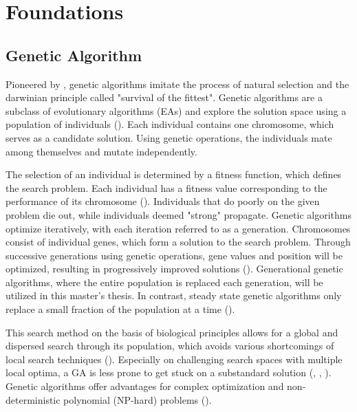 \chapter{Foundations}
\label{chap:foundations}

\section{Genetic Algorithm}
\label{sect:foundations:genetic_algorithm}
Pioneered by \cite{holland_adaptation_1992}, genetic algorithms imitate the process of natural selection and the darwinian principle called "survival of the fittest". Genetic algorithms are a subclass of evolutionary algorithms (EAs) and explore the solution space using a population of individuals (\cite{mills_determining_2015}). Each individual contains one chromosome, which serves as a candidate solution. Using genetic operations, the individuals mate among themselves and mutate independently. 

The selection of an individual is determined by a fitness function, which defines the search problem. Each individual has a fitness value corresponding to the performance of its chromosome (\cite{majumdar_genetic_2015}). Individuals that do poorly on the given problem die out, while individuals deemed "strong" propagate. Genetic algorithms optimize iteratively, with each iteration referred to as a generation. Chromosomes consist of individual genes, which form a solution to the search problem. Through successive generations using genetic operations, gene values and position will be optimized, resulting in progressively improved solutions (\cite{srinivas_genetic_1994}). Generational genetic algorithms, where the entire population is replaced each generation, will be utilized in this master's thesis. In contrast, steady state genetic algorithms only replace a small fraction of the population at a time (\cite{srinivas_genetic_1994}).

This search method on the basis of biological principles allows for a global and dispersed search through its population, which avoids various shortcomings of local search techniques (\cite{grefenstette_optimization_1986}). Especially on challenging search spaces with multiple local optima, a GA is less prone to get stuck on a substandard solution (\cite{katoch_review_2021}, \cite{xia_genetic_2019}, \cite{majumdar_genetic_2015}). Genetic algorithms offer advantages for complex optimization and non-deterministic polynomial (NP-hard) problems (\cite{hussain_trade-off_2020}).

